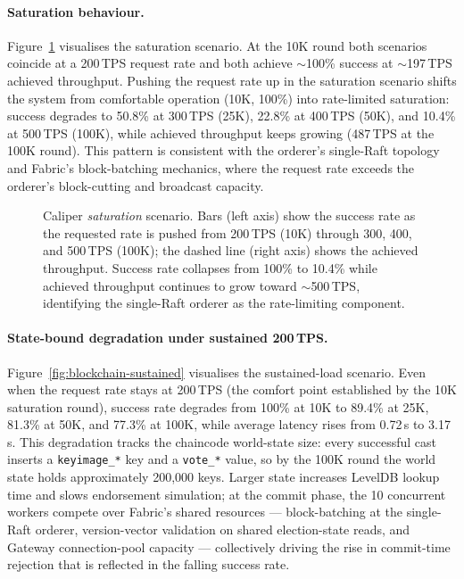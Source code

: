 \paragraph{Saturation behaviour.} Figure~\ref{fig:blockchain-saturation} visualises the saturation scenario. At the 10K round both scenarios coincide at a 200\,TPS request rate and both achieve $\sim$100\% success at $\sim$197\,TPS achieved throughput. Pushing the request rate up in the saturation scenario shifts the system from comfortable operation (10K, 100\%) into rate-limited saturation: success degrades to 50.8\% at 300\,TPS (25K), 22.8\% at 400\,TPS (50K), and 10.4\% at 500\,TPS (100K), while achieved throughput keeps growing (487\,TPS at the 100K round). This pattern is consistent with the orderer's single-Raft topology and Fabric's block-batching mechanics, where the request rate exceeds the orderer's block-cutting and broadcast capacity.

\begin{figure}[H]
\centering

\caption[Caliper saturation scenario: success rate collapses as request rate climbs]{Caliper \emph{saturation} scenario. Bars (left axis) show the success rate as the requested rate is pushed from 200\,TPS (10K) through 300, 400, and 500\,TPS (100K); the dashed line (right axis) shows the achieved throughput. Success rate collapses from 100\% to 10.4\% while achieved throughput continues to grow toward $\sim$500\,TPS, identifying the single-Raft orderer as the rate-limiting component.}
\label{fig:blockchain-saturation}
\end{figure}

\paragraph{State-bound degradation under sustained 200\,TPS.} Figure~\ref{fig:blockchain-sustained} visualises the sustained-load scenario. Even when the request rate stays at 200\,TPS (the comfort point established by the 10K saturation round), success rate degrades from 100\% at 10K to 89.4\% at 25K, 81.3\% at 50K, and 77.3\% at 100K, while average latency rises from 0.72\,s to 3.17\,s. This degradation tracks the chaincode world-state size: every successful cast inserts a \texttt{keyimage\_*} key and a \texttt{vote\_*} value, so by the 100K round the world state holds approximately 200{,}000 keys. Larger state increases LevelDB lookup time and slows endorsement simulation; at the commit phase, the 10 concurrent workers compete over Fabric's shared resources --- block-batching at the single-Raft orderer, version-vector validation on shared election-state reads, and Gateway connection-pool capacity --- collectively driving the rise in commit-time rejection that is reflected in the falling success rate.

